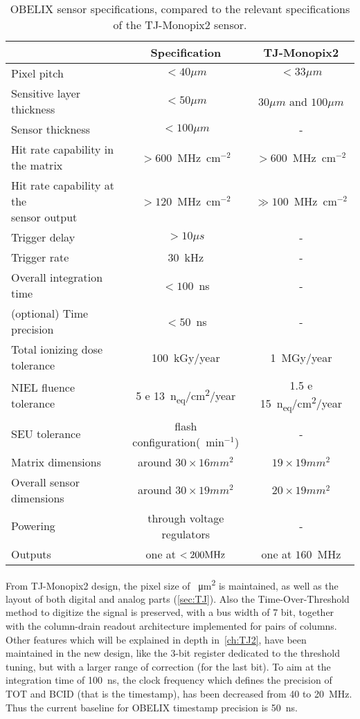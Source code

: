 \begin{table}
\centering
\begin{tabular}{lc|c}
\hline
\hline
 & Specification & TJ-Monopix2\\
\hline
Pixel pitch & $< 40 \mu m$ & $< 33 \mu m$ \\
Sensitive layer thickness & $< 50 \mu m$ & $30 \mu m$ and $ 100\mu m$ \\
Sensor thickness & $< 100\mu m$ & - \\
\hline
Hit rate capability in the matrix & $> 600$~MHz~cm$^{-2}$ & $> 600$~MHz~cm$^{-2}$ \\
\shortstack{Hit rate capability at the \\sensor output} & $>120$~MHz~cm$^{-2}$ & $\gg 100$~MHz~cm$^{-2}$ \\
Trigger delay & $>10 \mu s$ & - \\
Trigger rate & $30$~kHz & - \\
Overall integration time & $<100$~ns & - \\
(optional) Time precision & $<50$~ns & - \\
\hline
Total ionizing dose tolerance & 100~kGy/year & 1~MGy/year \\
NIEL fluence tolerance & \SI{5 e 13}{n_{eq}/cm^2/year}  & \SI{1.5 e 15}{n_{eq}/cm^2/year} \\
SEU tolerance & flash configuration(~min$^{-1}$) & - \\
\hline
Matrix dimensions & around $30 \times 16 mm^{2}$ & $19 \times 19 mm^{2}$ \\
Overall sensor dimensions & around $30 \times 19 mm^{2}$ & $20 \times 19 mm^{2}$\\
Powering & through voltage regulators & - \\
Outputs & one at $<200 \rm{ MHz}$ & one at $160$~MHz \\
\hline
\hline
\end{tabular}
\caption{OBELIX sensor specifications, compared to the relevant specifications of the TJ-Monopix2 sensor.}
\label{tab:obelix_specification}
\end{table}



From TJ-Monopix2 design, the pixel size of ~\unit{\micro m^{2}} is maintained, as well as the layout of both digital and analog parts (\autoref{sec:TJ}). Also the Time-Over-Threshold method to digitize the signal is preserved, with a bus width of 7 bit, together with the column-drain readout architecture implemented for pairs of columns. Other features which will be explained in depth in~\autoref{ch:TJ2}, have been maintained in the new design, like the 3-bit register dedicated to the threshold tuning, but with a larger range of correction (for the last bit). 
To aim at the integration time of \SI{100}{ns}, the clock frequency which defines the precision of TOT and BCID (that is the timestamp), has been decreased from 40 to \SI{20}{MHz}. Thus the current baseline for OBELIX timestamp precision is \SI{50}{ns}.

